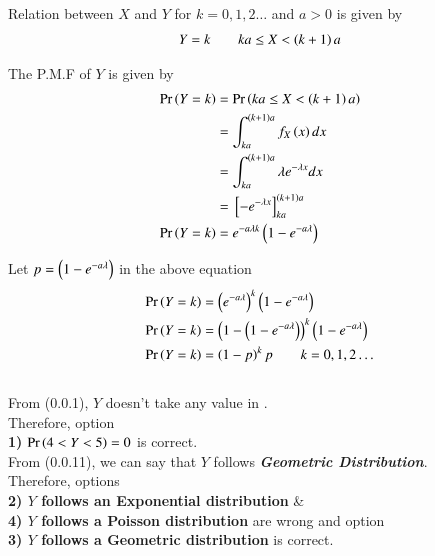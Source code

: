 \documentclass[journal,12pt,twocolumn]{IEEEtran}
\begin{document}
Relation between $X$ and $Y$ for $k=0,1,2\ldots$ and $a>0$ is given by
\begin{align}
    Y=k \qquad ka\leq X < \left(k+1\right)a
\end{align}

The P.M.F of $Y$ is given by
\begin{align}
    \Pr\left(Y=k\right) &= \Pr\left(ka\leq X < \left(k+1\right)a\right)\\
    &= \int_{ka}^{\left(k+1\right)a}f_X\left(x\right)dx\\
    &= \int_{ka}^{\left(k+1\right)a}\lambda e^{-\lambda x}dx\\
    &= {}\left[-e^{-\lambda x}\right]_{ka}^{\left(k+1\right)a}\\
    \Pr\left(Y=k\right) &= e^{-a\lambda k}\left(1 - e^{-a\lambda}\right)
\end{align}

Let $p=\left(1-e^{-a\lambda}\right)$ in the above equation
\begin{align}
    \Pr\left(Y=k\right) &= \left(e^{-a\lambda}\right)^k\left(1-e^{-a\lambda}\right)\\
    \Pr\left(Y=k\right) &= \left(1-\left(1-e^{-a\lambda}\right)\right)^k\left(1-e^{-a\lambda}\right)\\
    \Pr\left(Y=k\right) &= \left(1-p\right)^kp \qquad k=0,1,2\ldots
\end{align}\\

From (0.0.1), $Y$ doesn't take any value in .\\
Therefore, option \\ \textbf{1)} $\Pr\left(4<Y<5\right)=0$ is correct.\\

From (0.0.11), we can say that $Y$ follows \textit{\textbf{Geometric Distribution}}.\\
Therefore, options\\ \textbf{2) $Y$ follows an Exponential distribution} \& \\ \textbf{4) $Y$ follows a Poisson distribution} are wrong and option \\ \textbf{3) $Y$ follows a Geometric distribution} is correct.
\end{document}
